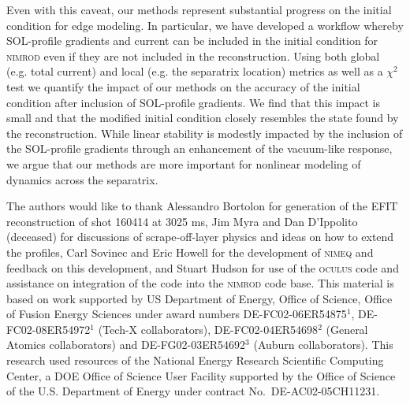 \documentclass[english,aps,superscriptaddress,showkeys,showpacs,prepri,twocolumn]{revtex4}
\begin{document}
Even with this caveat, our methods represent substantial progress on the
initial condition for edge modeling. In particular, we have developed a
workflow whereby SOL-profile gradients and current can be included in the
initial condition for \textsc{nimrod} even if they are not included in the
reconstruction.  Using both global (e.g. total current) and local (e.g. the
separatrix location) metrics as well as a $\chi^2$ test we quantify the impact
of our methods on the accuracy of the initial condition after inclusion of
SOL-profile gradients.  We find that this impact is small and that the modified
initial condition closely resembles the state found by the reconstruction.
While linear stability is modestly impacted by the inclusion of the SOL-profile
gradients through an enhancement of the vacuum-like response, we argue that our
methods are more important for nonlinear modeling of dynamics across the
separatrix.
\appendix


\begin{acknowledgments} 
The authors would like to thank Alessandro Bortolon for generation of the EFIT
reconstruction of shot 160414 at 3025 ms, Jim Myra and Dan D'Ippolito
(deceased) for discussions of scrape-off-layer physics and ideas on how to
extend the profiles, Carl Sovinec and Eric Howell for the development of
\textsc{nimeq} and feedback on this development, and Stuart Hudson for use of
the \textsc{oculus} code and assistance on integration of the code into the
\textsc{nimrod} code base.  This material is based on work supported by US
Department of Energy, Office of Science, Office of Fusion Energy Sciences under
award numbers DE-FC02-06ER54875$^1$, DE-FC02-08ER54972$^1$ (Tech-X
collaborators), DE-FC02-04ER54698$^2$ (General Atomics collaborators) and
DE-FG02-03ER54692$^3$ (Auburn collaborators).
This research used resources of the National Energy Research Scientific
Computing Center, a DOE Office of Science User Facility supported by the Office
of Science of the U.S.  Department of Energy under contract
No.~DE-AC02-05CH11231.
\end{acknowledgments}


\end{document}
